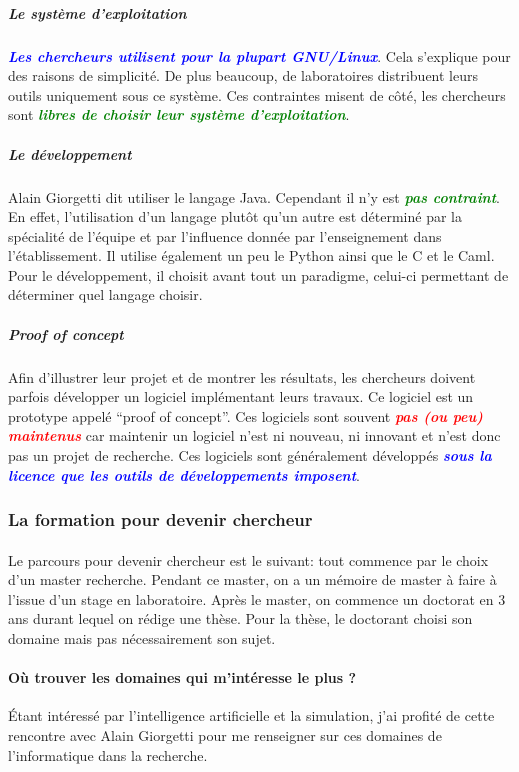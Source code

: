 \documentclass[a4paper,12pt, draft]{report}
\newcommand{\goodPoint}[1]{\textcolor{green}{\textbf{\textit{#1}}}}
\newcommand{\badPoint}[1]{\textcolor{red}{\textbf{\textit{#1}}}}
\newcommand{\importantPoint}[1]{\textcolor{blue}{\textbf{\textit{#1}}}}
\begin{document}
\subparagraph{Le système d'exploitation}
\importantPoint{Les chercheurs utilisent pour la plupart GNU/Linux}. Cela s'explique pour des raisons de simplicité. De plus beaucoup, de laboratoires distribuent leurs outils uniquement sous ce système. Ces contraintes misent de côté, les chercheurs sont \goodPoint{libres de choisir leur système d'exploitation}.

\subparagraph{Le développement}
Alain Giorgetti dit utiliser le langage Java. Cependant il n'y est \goodPoint{pas contraint}. En effet, l'utilisation d'un langage plutôt qu'un autre est déterminé par la spécialité de l'équipe et par l'influence donnée par l'enseignement dans l'établissement. Il utilise également un peu le Python ainsi que le C et le Caml.
Pour le développement, il choisit avant tout un paradigme, celui-ci permettant de déterminer quel langage choisir.

\subparagraph{Proof of concept}
Afin d'illustrer leur projet et de montrer les résultats, les chercheurs doivent parfois développer un logiciel implémentant leurs travaux. Ce logiciel est un prototype appelé ``proof of concept''. Ces logiciels sont souvent \badPoint{pas (ou peu) maintenus} car maintenir un logiciel n'est ni nouveau, ni innovant et n'est donc pas un projet de recherche. Ces logiciels sont généralement développés \importantPoint{sous la licence que les outils de développements imposent}.

\subsubsection{La formation pour devenir chercheur}
\paragraph{}
Le parcours pour devenir chercheur est le suivant:
tout commence par le choix d'un master recherche. Pendant ce master, on a un mémoire de master à faire à l'issue d'un stage en laboratoire.
Après le master, on commence un doctorat en 3 ans durant lequel on rédige une thèse. Pour la thèse, le doctorant choisi son domaine mais pas nécessairement son sujet.

\paragraph{Où trouver les domaines qui m'intéresse le plus ?}
Étant intéressé par l'intelligence artificielle et la simulation, j'ai profité de cette rencontre avec Alain Giorgetti pour me renseigner sur ces domaines de l'informatique dans la recherche.
\end{document}
